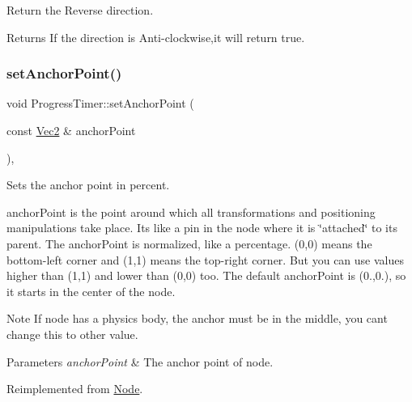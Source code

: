 Return the Reverse direction.

\begin{DoxyReturn}{Returns}
If the direction is Anti-\/clockwise,it will return true. 
\end{DoxyReturn}
\mbox{\label{classProgressTimer_a2d83a3a9d2aa6a7d949a3800c82dfc68}} 
\subsubsection{\texorpdfstring{set\+Anchor\+Point()}{setAnchorPoint()}\hspace{0.1cm}{\footnotesize\ttfamily [1/2]}}
{\footnotesize\ttfamily void Progress\+Timer\+::set\+Anchor\+Point (\begin{DoxyParamCaption}\item[{const \hyperlink{classVec2}{Vec2} \&}]{anchor\+Point }\end{DoxyParamCaption})\hspace{0.3cm}{\ttfamily [override]}, {\ttfamily [virtual]}}

Sets the anchor point in percent.

anchor\+Point is the point around which all transformations and positioning manipulations take place. It\textquotesingle{}s like a pin in the node where it is \char`\"{}attached\char`\"{} to its parent. The anchor\+Point is normalized, like a percentage. (0,0) means the bottom-\/left corner and (1,1) means the top-\/right corner. But you can use values higher than (1,1) and lower than (0,0) too. The default anchor\+Point is (0.,0.), so it starts in the center of the node. \begin{DoxyNote}{Note}
If node has a physics body, the anchor must be in the middle, you can\textquotesingle{}t change this to other value.
\end{DoxyNote}

\begin{DoxyParams}{Parameters}
{\em anchor\+Point} & The anchor point of node. \\
\hline
\end{DoxyParams}


Reimplemented from \hyperlink{classNode_a4dd45cb48a51df7c257675f527e3f277}{Node}.

\mbox{\label{classProgressTimer_a9f177a39d3158dd2f48f6558db5dcd02}} 
